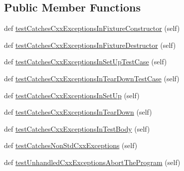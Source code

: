 \subsection*{Public Member Functions}
\begin{DoxyCompactItemize}
\item 
def \mbox{\hyperlink{classgoogletest_1_1test_1_1googletest-catch-exceptions-test_1_1_catch_cxx_exceptions_test_ab560817993b4ca2e8fab91a7e2e2591a}{test\+Catches\+Cxx\+Exceptions\+In\+Fixture\+Constructor}} (self)
\item 
def \mbox{\hyperlink{classgoogletest_1_1test_1_1googletest-catch-exceptions-test_1_1_catch_cxx_exceptions_test_aeea8925ed09bcc9a9de462cb1f88ab11}{test\+Catches\+Cxx\+Exceptions\+In\+Fixture\+Destructor}} (self)
\item 
def \mbox{\hyperlink{classgoogletest_1_1test_1_1googletest-catch-exceptions-test_1_1_catch_cxx_exceptions_test_adf50a585f2d75fc623cb9f0006ad3763}{test\+Catches\+Cxx\+Exceptions\+In\+Set\+Up\+Test\+Case}} (self)
\item 
def \mbox{\hyperlink{classgoogletest_1_1test_1_1googletest-catch-exceptions-test_1_1_catch_cxx_exceptions_test_a8d8a675db6ea35bbfe32c0a199473833}{test\+Catches\+Cxx\+Exceptions\+In\+Tear\+Down\+Test\+Case}} (self)
\item 
def \mbox{\hyperlink{classgoogletest_1_1test_1_1googletest-catch-exceptions-test_1_1_catch_cxx_exceptions_test_a5873abf08829ce9bb0cebe84e734b467}{test\+Catches\+Cxx\+Exceptions\+In\+Set\+Up}} (self)
\item 
def \mbox{\hyperlink{classgoogletest_1_1test_1_1googletest-catch-exceptions-test_1_1_catch_cxx_exceptions_test_a8d79b6f98e9e93b99db24083415b4d25}{test\+Catches\+Cxx\+Exceptions\+In\+Tear\+Down}} (self)
\item 
def \mbox{\hyperlink{classgoogletest_1_1test_1_1googletest-catch-exceptions-test_1_1_catch_cxx_exceptions_test_a0df335426a34f8e090b0d94e7e77c499}{test\+Catches\+Cxx\+Exceptions\+In\+Test\+Body}} (self)
\item 
def \mbox{\hyperlink{classgoogletest_1_1test_1_1googletest-catch-exceptions-test_1_1_catch_cxx_exceptions_test_a7762c2c15538806899fe20e14c978f77}{test\+Catches\+Non\+Std\+Cxx\+Exceptions}} (self)
\item 
def \mbox{\hyperlink{classgoogletest_1_1test_1_1googletest-catch-exceptions-test_1_1_catch_cxx_exceptions_test_a2c15348b090e12bea15c99b8d90ce8c0}{test\+Unhandled\+Cxx\+Exceptions\+Abort\+The\+Program}} (self)
\end{DoxyCompactItemize}


